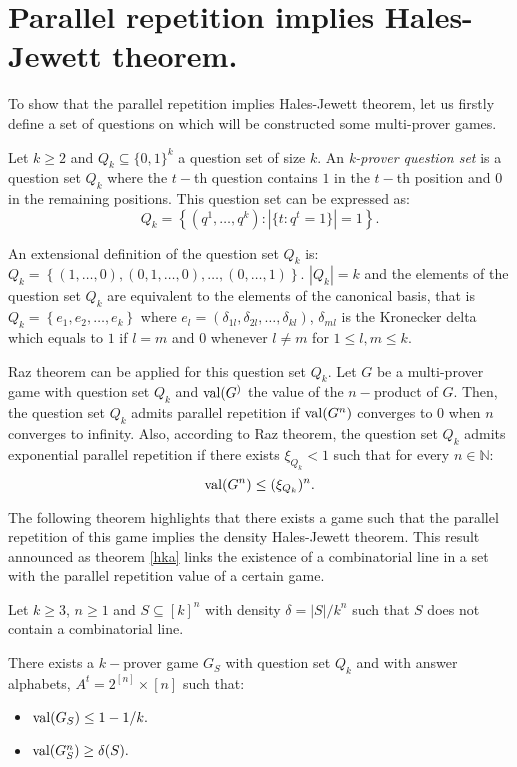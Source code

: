 \section{Parallel repetition implies Hales-Jewett theorem.}
 
To show that the parallel repetition implies Hales-Jewett theorem, let us firstly define a set of questions on which will be constructed some multi-prover games.

\begin{defn}Let $k\geq 2$ and $Q_k \subseteq \{0,1\}^k$ a question set of size $k.$ An \textit{k-prover question set} is a question set $Q_k$ where the $t-$th question contains $1$ in the $t-$th position and $0$ in the remaining positions. This question set can be expressed as:
$$Q_k=\left\lbrace(q^1, \ldots, q^k): |\{t:q^t=1\}|=1\right\rbrace.$$		\end{defn}
 
 An extensional definition of the question set $Q_k$ is: $Q_k=\left\lbrace (1,\ldots,0), (0,1,\ldots,0), \ldots, (0,\ldots,1) \right\rbrace.$ $|Q_k|=k$ and the elements of the question set $Q_k$ are equivalent to the elements of the canonical basis, that is $Q_k= \left\lbrace e_1, e_2, \ldots, e_k\right\rbrace$ where $e_l=(\delta_{1l}, \delta_{2l}, \ldots, \delta_{kl} )$, $\delta_{ml}$ is the Kronecker delta which equals to $1$ if $l=m$ and $0$ whenever $l \neq m$ for $1 \leq l, m \leq  k.$ 
 
 
 Raz theorem can be applied for this question set $Q_k$.
 Let $G$ be a multi-prover game with question set $Q_k$ and $\mathrm{val} (G^)$ the value of the $n-$product of $G.$  Then, the question set $Q_k$ admits parallel repetition if $ \mathrm{val} (G^n)$ converges to $0$ when $n$ converges to infinity.
 Also, according to Raz theorem,
 the question set $Q_k$  admits exponential parallel repetition if there exists $\xi_{Q_k} < 1$ such that for every $n \in \mathbb{N}$: $$\mathrm{val} (G^n) \leq (\xi_{Q_k})^n.$$

The following theorem highlights that there exists a game such that the parallel repetition of this game  implies the density Hales-Jewett theorem. This result announced as theorem \eqref{hka} links the existence of a combinatorial line in a set with the parallel repetition value of a certain game.

 \begin{thm} Let $k\geq 3$, $n\geq 1$ and $S\subseteq [k]^n$ with density $\delta=|S|/k^n$ such that $S$ does not contain a combinatorial line.	
 
There exists a $k-$prover game $G_S$ with question set $Q_k$ and with answer alphabets,
$A^t = 2^{[n]} \times [n]$ such that:
\begin{itemize}
\item $\mathrm{val} (G_S) \leq 1-1/k.$ 	\item $\mathrm{val} (G_S^n) \geq \delta(S).$
\end{itemize} \label{hka}
 	\end{thm}

